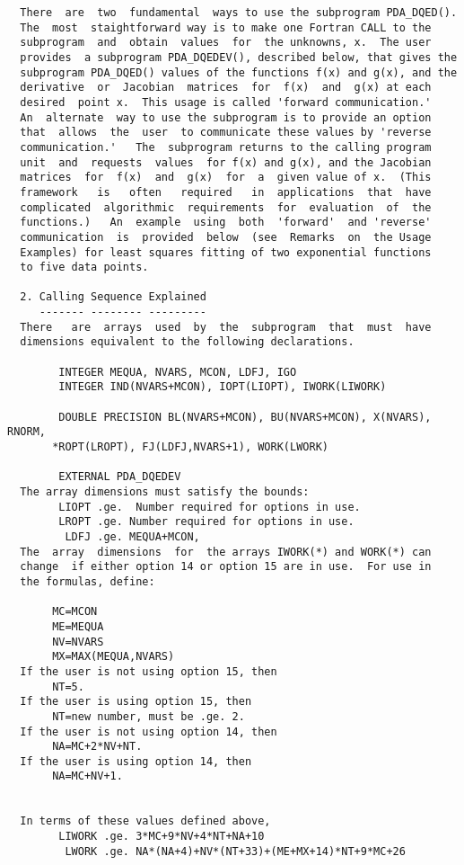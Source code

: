 \begin{verbatim}
  There  are  two  fundamental  ways to use the subprogram PDA_DQED().
  The  most  staightforward way is to make one Fortran CALL to the
  subprogram  and  obtain  values  for  the unknowns, x.  The user
  provides  a subprogram PDA_DQEDEV(), described below, that gives the
  subprogram PDA_DQED() values of the functions f(x) and g(x), and the
  derivative  or  Jacobian  matrices  for  f(x)  and  g(x) at each
  desired  point x.  This usage is called 'forward communication.'
  An  alternate  way to use the subprogram is to provide an option
  that  allows  the  user  to communicate these values by 'reverse
  communication.'   The  subprogram returns to the calling program
  unit  and  requests  values  for f(x) and g(x), and the Jacobian
  matrices  for  f(x)  and  g(x)  for  a  given value of x.  (This
  framework   is   often   required   in  applications  that  have
  complicated  algorithmic  requirements  for  evaluation  of  the
  functions.)   An  example  using  both  'forward'  and 'reverse'
  communication  is  provided  below  (see  Remarks  on  the Usage
  Examples) for least squares fitting of two exponential functions
  to five data points.

  2. Calling Sequence Explained
     ------- -------- ---------
  There   are  arrays  used  by  the  subprogram  that  must  have
  dimensions equivalent to the following declarations.

        INTEGER MEQUA, NVARS, MCON, LDFJ, IGO
        INTEGER IND(NVARS+MCON), IOPT(LIOPT), IWORK(LIWORK)

        DOUBLE PRECISION BL(NVARS+MCON), BU(NVARS+MCON), X(NVARS), RNORM,
       *ROPT(LROPT), FJ(LDFJ,NVARS+1), WORK(LWORK)

        EXTERNAL PDA_DQEDEV
  The array dimensions must satisfy the bounds:
        LIOPT .ge.  Number required for options in use.
        LROPT .ge. Number required for options in use.
         LDFJ .ge. MEQUA+MCON,
  The  array  dimensions  for  the arrays IWORK(*) and WORK(*) can
  change  if either option 14 or option 15 are in use.  For use in
  the formulas, define:

       MC=MCON
       ME=MEQUA
       NV=NVARS
       MX=MAX(MEQUA,NVARS)
  If the user is not using option 15, then
       NT=5.
  If the user is using option 15, then
       NT=new number, must be .ge. 2.
  If the user is not using option 14, then
       NA=MC+2*NV+NT.
  If the user is using option 14, then
       NA=MC+NV+1.


  In terms of these values defined above,
        LIWORK .ge. 3*MC+9*NV+4*NT+NA+10
         LWORK .ge. NA*(NA+4)+NV*(NT+33)+(ME+MX+14)*NT+9*MC+26


\end{verbatim}
